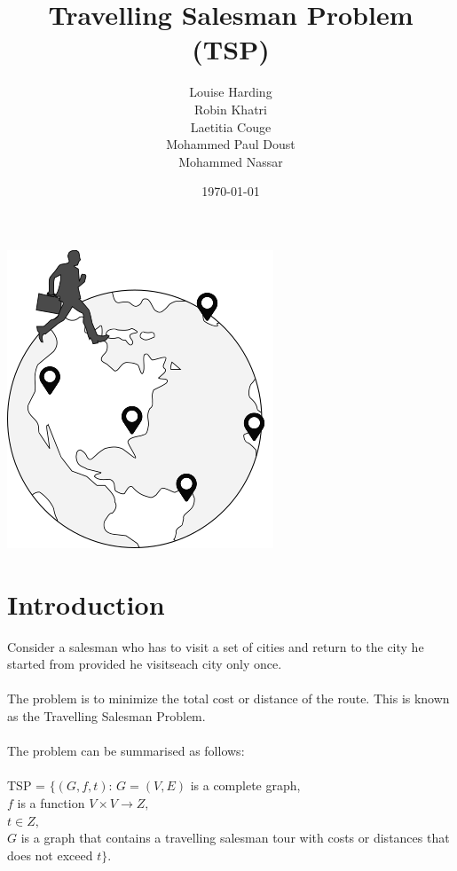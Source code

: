 \documentclass[11pt, english]{article}
\title{{\bf Travelling Salesman Problem (TSP)}}
\author{Louise Harding \\ Robin Khatri \\ Laetitia Couge\\ Mohammed Paul Doust \\ Mohammed Nassar}
\date{\today}
\begin{document}
\newcommand\tab[1][1.2cm]{\hspace*{#1}}

\begin{titlingpage}
\maketitle
\center \includegraphics[scale=0.5]{tsp.png}

\end{titlingpage}
\tableofcontents
\newpage

\section{Introduction}

Consider a salesman who has to visit a set of cities and return to the city he started from provided he visitseach city only once.\\
\\
\noindent
The problem is to minimize the total cost or distance of the route. This is known as the Travelling Salesman Problem.\\
\\
\noindent
The problem can be summarised as follows: \\
\\
\tab TSP = $\{(G,f,t)$: $G = (V,E)$ is a complete graph,\\
\tab \tab $f$ is a function $V\times V \rightarrow Z,$\\
\tab \tab $t \in Z,$ \\
\tab \tab $G$ is a graph that contains a travelling salesman tour with costs or distances that\\ \tab \tab does not exceed $t\}$.
\end{document}
